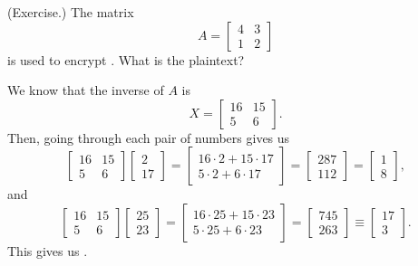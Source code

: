 \documentclass[letterpaper]{article}
\newcommand{\0}{\mathbf{0}}
\begin{document}
\begin{mdframed}
    (Exercise.) The matrix \[A = \begin{bmatrix}
        4 & 3 \\ 1 & 2
    \end{bmatrix}\] is used to encrypt . What is the plaintext? 

    \begin{mdframed}
        We know that the inverse of $A$ is \[X =  \begin{bmatrix}
            16 & 15 \\ 
            5 & 6 
        \end{bmatrix}.\] Then, going through each pair of numbers gives us 
        \[\begin{bmatrix}
            16 & 15 \\ 5 & 6
        \end{bmatrix} \begin{bmatrix}
            2 \\ 17
        \end{bmatrix} = \begin{bmatrix}
            16 \cdot 2 + 15 \cdot 17 \\ 
            5 \cdot 2 + 6 \cdot 17
        \end{bmatrix} = \begin{bmatrix}
            287 \\ 
            112
        \end{bmatrix} = \begin{bmatrix}
            1 \\ 
            8
        \end{bmatrix},\]
        and 
        \[\begin{bmatrix}
            16 & 15 \\ 5 & 6
        \end{bmatrix} \begin{bmatrix}
            25 \\ 23
        \end{bmatrix} = \begin{bmatrix}
            16 \cdot 25 + 15 \cdot 23 \\ 
            5 \cdot 25 + 6 \cdot 23 
        \end{bmatrix} = \begin{bmatrix}
            745 \\ 263
        \end{bmatrix} \equiv \begin{bmatrix}
            17 \\ 3
        \end{bmatrix}.\]
        This gives us .
    \end{mdframed}
\end{mdframed}
\end{document}
